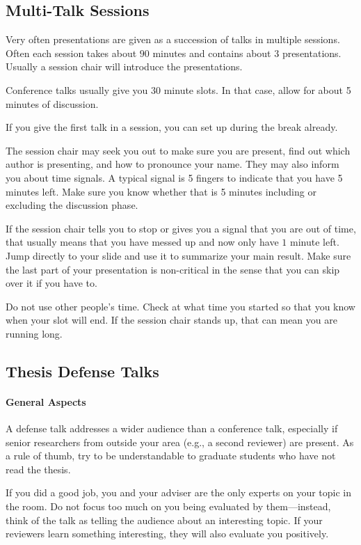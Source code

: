 \documentclass[12pt]{article}
\begin{document}
\subsection{Multi-Talk Sessions}

Very often presentations are given as a succession of talks in multiple sessions.
Often each session takes about $90$ minutes and contains about $3$ presentations.
Usually a session chair will introduce the presentations.
\medskip

Conference talks usually give you 30 minute slots.
In that case, allow for about 5 minutes of discussion.
\medskip

If you give the first talk in a session, you can set up during the break already.
\medskip

The session chair may seek you out to make sure you are present, find out which author is presenting, and how to pronounce your name.
They may also inform you about time signals.
A typical signal is 5 fingers to indicate that you have 5 minutes left.
Make sure you know whether that is 5 minutes including or excluding the discussion phase.
\medskip

If the session chair tells you to stop or gives you a signal that you are out of time, that usually means that you have messed up and now only have $1$ minute left.
Jump directly to your slide and use it to summarize your main result.
Make sure the last part of your presentation is non-critical in the sense that you can skip over it if you have to.
\medskip

Do not use other people's time.
Check at what time you started so that you know when your slot will end.
If the session chair stands up, that can mean you are running long.

\subsection{Thesis Defense Talks}

\paragraph{General Aspects}
A defense talk addresses a wider audience than a conference talk, especially if senior researchers from outside your area (e.g., a second reviewer) are present.
As a rule of thumb, try to be understandable to graduate students who have not read the thesis.
\medskip

If you did a good job, you and your adviser are the only experts on your topic in the room.
Do not focus too much on you being evaluated by them---instead, think of the talk as telling the audience about an interesting topic.
If your reviewers learn something interesting, they will also evaluate you positively. 
\medskip
\end{document}
